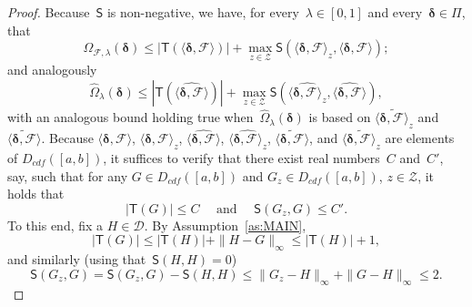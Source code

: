 \documentclass[11pt, a4paper]{article}
\theoremstyle{definition}
\begin{document}
\begin{proof}
Because~$\mathsf{S}$ is non-negative, we have, for every~$\lambda \in [0, 1]$ and every~$\bm{\delta} \in \Pi$, that~$$\Omega_{\mathcal{F}, \lambda}(\bm{\delta}) \leq |\mathsf{T}\left( \langle \bm{\delta}, \mathcal{F} \rangle \right)| + \max_{z \in \mathcal{Z}} \mathsf{S} \left(\langle \bm{\delta}, \mathcal{F} \rangle_z , \langle \bm{\delta}, \mathcal{F} \rangle \right);$$ and analogously $$\hat{\Omega}_{\lambda}(\bm{\delta})  \leq |\mathsf{T}(\widehat{\langle \bm{\delta}, \mathcal{F} \rangle})| + \max_{z \in \mathcal{Z}} \mathsf{S}(\widehat{\langle \bm{\delta}, \mathcal{F} \rangle_z}, \widehat{\langle \bm{\delta}, \mathcal{F} \rangle}),$$ with an analogous bound holding true when~$\hat{\Omega}_{\lambda}(\bm{\delta})$ is based on $\widetilde{\langle \bm{\delta}, \mathcal{F} \rangle_z}$ and $\widetilde{\langle \bm{\delta}, \mathcal{F} \rangle}$. Because $\langle \bm{\delta}, \mathcal{F} \rangle$, $\langle \bm{\delta}, \mathcal{F} \rangle_z$, $\widehat{\langle \bm{\delta}, \mathcal{F} \rangle}$, $\widehat{\langle \bm{\delta}, \mathcal{F} \rangle_z}$, $\widetilde{\langle \bm{\delta}, \mathcal{F} \rangle}$, and $\widetilde{\langle \bm{\delta}, \mathcal{F} \rangle_z}$ are  elements of $D_{cdf}([a,b])$, it suffices to verify that there exist real numbers~$C$ and~$C'$, say, such that for any $G \in D_{cdf}([a,b])$ and $G_z \in D_{cdf}([a,b])$, $z \in \mathcal{Z}$, it holds that $$|\mathsf{T}(G)| \leq C \quad \text{ and } \quad \mathsf{S}(G_z, G) \leq C'.$$ To this end, fix a $H \in \mathscr{D}$. By Assumption~\ref{as:MAIN},  $$|\mathsf{T}\left( G \right)| \leq |\mathsf{T}\left( H \right)| + \|H - G\|_{\infty} \leq |\mathsf{T}\left( H \right)| + 1,$$ and similarly (using that~$\mathsf{S}(H, H) = 0$) $$\mathsf{S}\left( G_z,  G \right) = \mathsf{S}\left( G_z,  G \right) - \mathsf{S}(H, H)\leq \|G_z - H\|_{\infty} + \|G - H\|_{\infty} \leq 2.$$
\end{proof}
\end{document}
